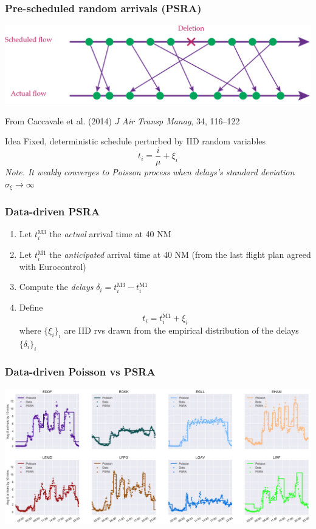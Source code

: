 \documentclass[table,aspectratio=169]{beamer}
\begin{document}
\begin{frame}[t]\frametitle{Pre-scheduled random arrivals (PSRA)}
    \centering
    \includegraphics[width=.65\textwidth]{psra-1}

    {\tiny From Caccavale et al. (2014) \emph{J Air Transp Manag}, 34, 116--122}

    \vfill

    \begin{alertblock}{Idea}
        Fixed, deterministic schedule perturbed by IID random variables
        \[ t_i = \frac{i}{\mu} + \xi_i \]
        \emph{\alert{Note.} It weakly converges to Poisson process
        when delays's standard deviation $\sigma_{\xi} \to \infty$}
    \end{alertblock}
\end{frame}

\begin{frame}[t]\frametitle{Data-driven PSRA}
    \begin{enumerate}
        \item Let $t^{\mathrm{M3}}_i$ the \alert{\emph{actual} arrival} time at 40 NM
        \item Let $t^{\mathrm{M1}}_i$ the \alert{\emph{anticipated} arrival} time at 40 NM (from the last flight plan agreed with Eurocontrol)
        \item Compute the \emph{delays} $\delta_i = t^{\mathrm{M3}}_i - t^{\mathrm{M1}}_i$
        \item Define
        \[t_i = t^{\mathrm{M1}}_i + \xi_i\]
        where $\{\xi_i\}_i$ are IID rvs drawn from the empirical distribution of the delays $\{\delta_i\}_i$
    \end{enumerate}
\end{frame}

\begin{frame}[t]\frametitle{Data-driven Poisson vs PSRA}
    \centering
    \includegraphics[width=.9\textwidth]{mean_simul_arrivals}
\end{frame}
\end{document}
